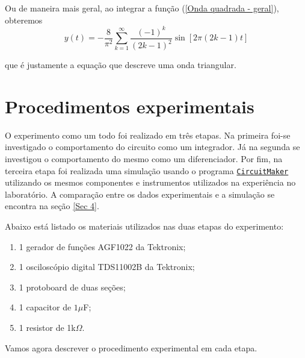 \documentclass[letterpaper, 12pt]{article}
\begin{document}
Ou de maneira mais geral, ao integrar a função (\ref{Onda quadrada - geral}), obteremos
\begin{equation}\label{Onda triangular - geral}
    y(t)=-\frac{8}{\pi^{2}}\sum_{k=1}^{\infty}\frac{(-1)^{k}}{(2k-1)^{2}}\sin{[2\pi(2k-1)t]}
\end{equation}

que é justamente a equação que descreve uma onda triangular.





\section{Procedimentos experimentais}\label{Seção 3 - Experimento}
O experimento como um todo foi realizado em três etapas. Na primeira foi-se investigado o comportamento do circuito como um integrador. Já na segunda se investigou o comportamento do mesmo como um diferenciador. Por fim, na terceira etapa foi realizada uma simulação usando o programa \href{https://docente.ifrn.edu.br/leonardoteixeira/links/instalador-do-circuitmaker-student/view}{\texttt{CircuitMaker}} utilizando os mesmos componentes e instrumentos utilizados na experiência no laboratório. A comparação entre os dados experimentais e a simulação se encontra na seção \ref{Sec 4}. 

Abaixo está listado os materiais utilizados nas duas etapas do experimento:
\begin{enumerate}
    \item 1 gerador de funções AGF1022 da Tektronix;
    \item 1 osciloscópio digital TDS11002B da Tektronix;
    \item 1 protoboard de duas seções;
    \item 1 capacitor de $1\mu$F;
    \item 1 resistor de 1k$\Omega$.
\end{enumerate}

Vamos agora descrever o procedimento experimental em cada etapa.
\end{document}

